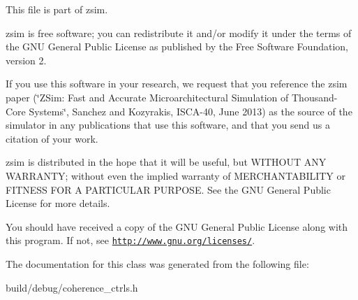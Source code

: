 This file is part of zsim.

zsim is free software; you can redistribute it and/or modify it under the terms of the G\-N\-U General Public License as published by the Free Software Foundation, version 2.

If you use this software in your research, we request that you reference the zsim paper (\char`\"{}\-Z\-Sim\-: Fast and Accurate Microarchitectural Simulation of
\-Thousand-\/\-Core Systems\char`\"{}, Sanchez and Kozyrakis, I\-S\-C\-A-\/40, June 2013) as the source of the simulator in any publications that use this software, and that you send us a citation of your work.

zsim is distributed in the hope that it will be useful, but W\-I\-T\-H\-O\-U\-T A\-N\-Y W\-A\-R\-R\-A\-N\-T\-Y; without even the implied warranty of M\-E\-R\-C\-H\-A\-N\-T\-A\-B\-I\-L\-I\-T\-Y or F\-I\-T\-N\-E\-S\-S F\-O\-R A P\-A\-R\-T\-I\-C\-U\-L\-A\-R P\-U\-R\-P\-O\-S\-E. See the G\-N\-U General Public License for more details.

You should have received a copy of the G\-N\-U General Public License along with this program. If not, see \href{http://www.gnu.org/licenses/}{\tt http\-://www.\-gnu.\-org/licenses/}. 

The documentation for this class was generated from the following file\-:\begin{DoxyCompactItemize}
\item 
build/debug/coherence\-\_\-ctrls.\-h\end{DoxyCompactItemize}
